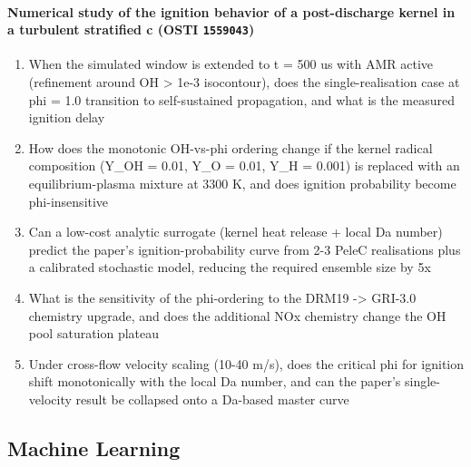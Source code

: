 \paragraph{Numerical study of the ignition behavior of a post-discharge kernel in a turbulent stratified c \textnormal{\small(OSTI \texttt{1559043})}}
\begin{enumerate}[leftmargin=1.6em,itemsep=0.2em,topsep=0.2em,label=Q\arabic*.]
\item When the simulated window is extended to t = 500 us with AMR active (refinement around OH \textgreater{} 1e-3 isocontour), does the single-realisation case at phi = 1.0 transition to self-sustained propagation, and what is the measured ignition delay
\item How does the monotonic OH-vs-phi ordering change if the kernel radical composition (Y\_OH = 0.01, Y\_O = 0.01, Y\_H = 0.001) is replaced with an equilibrium-plasma mixture at 3300 K, and does ignition probability become phi-insensitive
\item Can a low-cost analytic surrogate (kernel heat release + local Da number) predict the paper's ignition-probability curve from 2-3 PeleC realisations plus a calibrated stochastic model, reducing the required ensemble size by 5x
\item What is the sensitivity of the phi-ordering to the DRM19 -\textgreater{} GRI-3.0 chemistry upgrade, and does the additional NOx chemistry change the OH pool saturation plateau
\item Under cross-flow velocity scaling (10-40 m/s), does the critical phi for ignition shift monotonically with the local Da number, and can the paper's single-velocity result be collapsed onto a Da-based master curve
\end{enumerate}
\subsection*{Machine Learning}
